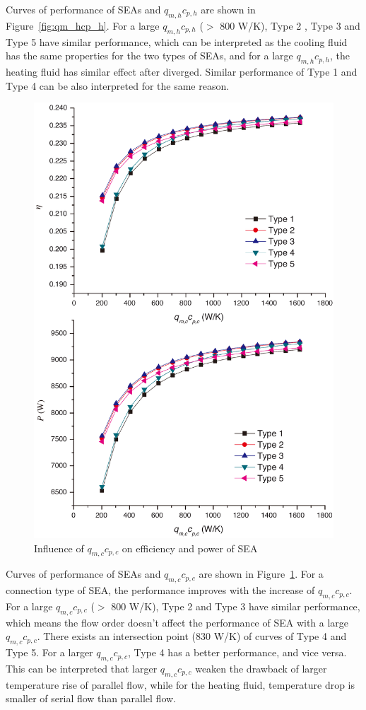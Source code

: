 \documentclass[preprint,5p, twocolumn]{elsarticle}
\begin{document}
Curves of performance of SEAs and $q_{m,h}c_{p,h}$ are shown in Figure~\ref{fig:qm_hcp_h}.
For a large $q_{m,h}c_{p,h}$ ($>$ 800 W/K), Type 2 , Type 3 and Type 5 have similar performance, which can be interpreted as the cooling fluid has the same properties for the two types of SEAs, and for a large $q_{m,h}c_{p,h}$, the heating fluid has similar effect after diverged. Similar performance of Type 1 and Type 4 can be also interpreted for the same reason.

\noindent \begin{figure}[htbp]
\begin{center}
	\includegraphics[width = 0.7\columnwidth]{./graphics/qm_ccp_c}
	\caption{Influence of $q_{m,c}c_{p,c}$ on efficiency and power of SEA}
	\label{fig:qm_ccp_c}
\end{center}
\end{figure}

Curves of performance of SEAs and $q_{m,c}c_{p,c}$ are shown in Figure~\ref{fig:qm_ccp_c}. For a connection type of SEA, the performance improves with the increase of $q_{m,c}c_{p,c}$. For a large $q_{m,c}c_{p,c}$ ($>$ 800 W/K), Type 2 and Type 3 have similar performance, which means the flow order doesn't affect the performance of SEA with a large $q_{m,c}c_{p,c}$. There exists an intersection point (830 W/K) of curves of Type 4 and Type 5. For a larger $q_{m,c}c_{p,c}$, Type 4 has a better performance, and vice versa. This can be interpreted that larger $q_{m,c}c_{p,c}$ weaken the drawback of larger temperature rise of parallel flow, while for the heating fluid, temperature drop is smaller of serial flow than parallel flow.
\end{document}
